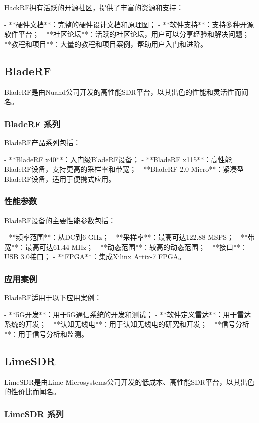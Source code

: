﻿\documentclass[UTF8]{ctexbook}
\begin{document}
HackRF拥有活跃的开源社区，提供了丰富的资源和支持：

- **硬件文档**：完整的硬件设计文档和原理图；
- **软件支持**：支持多种开源软件平台；
- **社区论坛**：活跃的社区论坛，用户可以分享经验和解决问题；
- **教程和项目**：大量的教程和项目案例，帮助用户入门和进阶。

\subsection{BladeRF}

BladeRF是由Nuand公司开发的高性能SDR平台，以其出色的性能和灵活性而闻名。

\subsubsection{BladeRF 系列}

BladeRF产品系列包括：

- **BladeRF x40**：入门级BladeRF设备；
- **BladeRF x115**：高性能BladeRF设备，支持更高的采样率和带宽；
- **BladeRF 2.0 Micro**：紧凑型BladeRF设备，适用于便携式应用。

\subsubsection{性能参数}

BladeRF设备的主要性能参数包括：

- **频率范围**：从DC到6 GHz；
- **采样率**：最高可达122.88 MSPS；
- **带宽**：最高可达61.44 MHz；
- **动态范围**：较高的动态范围；
- **接口**：USB 3.0接口；
- **FPGA**：集成Xilinx Artix-7 FPGA。

\subsubsection{应用案例}

BladeRF适用于以下应用案例：

- **5G开发**：用于5G通信系统的开发和测试；
- **软件定义雷达**：用于雷达系统的开发；
- **认知无线电**：用于认知无线电的研究和开发；
- **信号分析**：用于信号分析和监测。

\subsection{LimeSDR}

LimeSDR是由Lime Microsystems公司开发的低成本、高性能SDR平台，以其出色的性价比而闻名。

\subsubsection{LimeSDR 系列}
\end{document}
